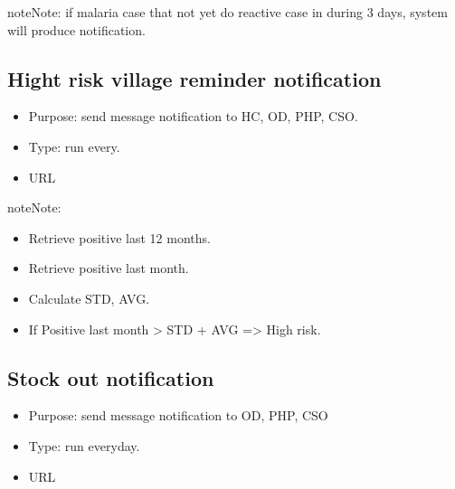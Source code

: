 \documentclass[letterpaper,10pt,english,openany,oneside]{sphinxmanual}
\begin{document}
\begin{sphinxadmonition}{note}{Note:}
\sphinxAtStartPar
if malaria case that not yet do reactive case in during 3 days, system will produce notification.
\end{sphinxadmonition}


\subsection{Hight risk village reminder notification}
\label{\detokenize{cron-job/cron-job:hight-risk-village-reminder-notification}}\begin{itemize}
\item {} 
\sphinxAtStartPar
Purpose: send message notification to HC, OD, PHP, CSO.

\item {} 
\sphinxAtStartPar
Type: run every.

\item {} 
\sphinxAtStartPar
URL 

\end{itemize}

\begin{sphinxadmonition}{note}{Note:}\begin{itemize}
\item {} 
\sphinxAtStartPar
Retrieve positive last 12 months.

\item {} 
\sphinxAtStartPar
Retrieve positive last month.

\item {} 
\sphinxAtStartPar
Calculate STD, AVG.

\item {} 
\sphinxAtStartPar
If Positive last month > STD + AVG => High risk.

\end{itemize}
\end{sphinxadmonition}


\subsection{Stock out notification}
\label{\detokenize{cron-job/cron-job:stock-out-notification}}\begin{itemize}
\item {} 
\sphinxAtStartPar
Purpose: send message notification to OD, PHP, CSO

\item {} 
\sphinxAtStartPar
Type: run everyday.

\item {} 
\sphinxAtStartPar
URL 

\end{itemize}
\end{document}
